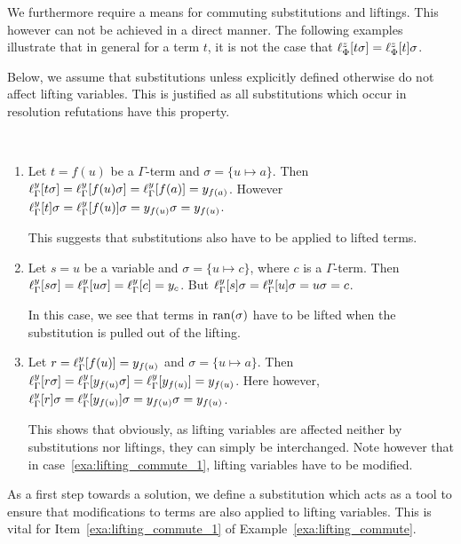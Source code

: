 We furthermore require a means for commuting substitutions and liftings.
This however can not be achieved in a direct manner. The following examples illustrate
that in general for a term $t$, it is not the case that
$
\ell_{\Phi}^{z}[t\sigma] =
\ell_{\Phi}^{z}[t]\sigma 
$.

Below, we assume that substitutions unless explicitly defined otherwise do not affect lifting variables.
This is justified as all substitutions which occur in resolution refutations have this property.

\begin{exa}
	\label{exa:lifting_commute}
	~
	\begin{enumerate}
		\item
			\label{exa:lifting_commute_1}
			Let $t = f(u)$ be a $\Gamma$-term and $\sigma = \{u \mapsto a\}$.
			Then $\ell_{\Gamma}^{y}[t\sigma] = \ell_{\Gamma}^{y}[f(u)\sigma] = \ell_{\Gamma}^{y}[f(a)] = y_{f(a)}$.
			However $\ell_{\Gamma}^{y}[t]\sigma = \ell_{\Gamma}^{y}[f(u)]\sigma = y_{f(u)}\sigma = y_{f(u)}$.

			This suggests that substitutions also have to be applied to lifted terms.

		\item
			\label{exa:lifting_commute_2}
			Let $s=u$ be a variable and $\sigma = \{u\mapsto c\}$, where $c$ is a $\Gamma$-term.
			Then $\ell_{\Gamma}^{y}[s\sigma] = 
			\ell_{\Gamma}^{y}[u\sigma] =
			\ell_{\Gamma}^{y}[c] = y_c$.
			But 
			$\ell_{\Gamma}^{y}[s]\sigma = 
			\ell_{\Gamma}^{y}[u]\sigma = 
			u\sigma = 
			c$.

			In this case, we see that terms in $\operatorname{ran}(\sigma)$ have to be lifted when the substitution is pulled out of the lifting.

		\item
			\label{exa:lifting_commute_3}
			Let $r = \ell_{\Gamma}^{y}[f(u)] = y_{f(u)}$ and $\sigma = \{u\mapsto a\}$.
			Then $\ell_{\Gamma}^{y}[r\sigma] = \ell_{\Gamma}^{y}[y_{f(u)}\sigma] = \ell_{\Gamma}^{y}[y_{f(u)}] = y_{f(u)}$.
			Here however, $\ell_{\Gamma}^{y}[r]\sigma = \ell_{\Gamma}^{y}[y_{f(u)}]\sigma = y_{f(u)}\sigma = y_{f(u)}$.

			This shows that obviously, as lifting variables are affected neither by substitutions nor liftings, they can simply be interchanged.
			Note however that in case~\ref{exa:lifting_commute_1}, lifting variables have to be modified.
			\qedhere
	\end{enumerate}
\end{exa}

As a first step towards a solution, we define a substitution which acts as a tool to ensure that modifications to terms are also applied to lifting variables.
This is vital for Item~\ref{exa:lifting_commute_1} of Example~\ref{exa:lifting_commute}.

